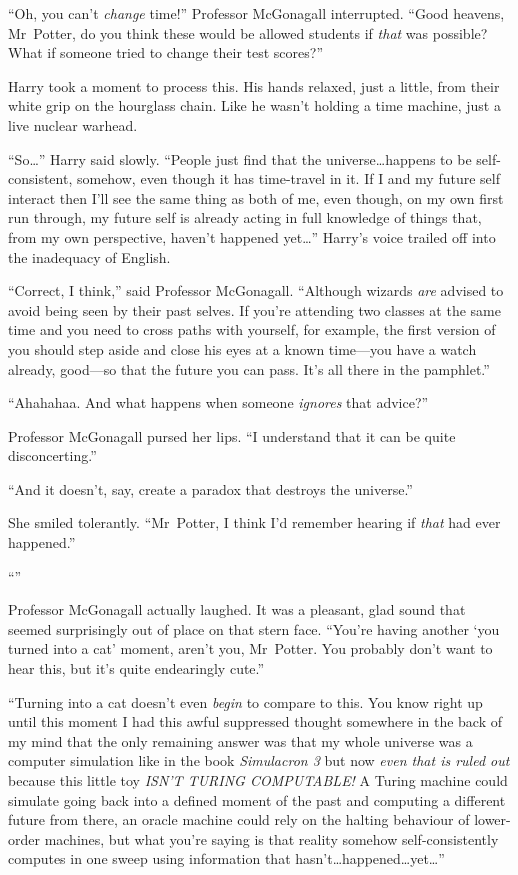 “Oh, you can’t \emph{change} time!” Professor McGonagall interrupted. “Good heavens, Mr~Potter, do you think these would be allowed students if \emph{that} was possible? What if someone tried to change their test scores?”

Harry took a moment to process this. His hands relaxed, just a little, from their white grip on the hourglass chain. Like he wasn’t holding a time machine, just a live nuclear warhead.

“So…” Harry said slowly. “People just find that the universe…happens to be self-consistent, somehow, even though it has time-travel in it. If I and my future self interact then I’ll see the same thing as both of me, even though, on my own first run through, my future self is already acting in full knowledge of things that, from my own perspective, haven’t happened yet…” Harry’s voice trailed off into the inadequacy of English.

“Correct, I think,” said Professor McGonagall. “Although wizards \emph{are} advised to avoid being seen by their past selves. If you’re attending two classes at the same time and you need to cross paths with yourself, for example, the first version of you should step aside and close his eyes at a known time—you have a watch already, good—so that the future you can pass. It’s all there in the pamphlet.”

“Ahahahaa. And what happens when someone \emph{ignores} that advice?”

Professor McGonagall pursed her lips. “I understand that it can be quite disconcerting.”

“And it doesn’t, say, create a paradox that destroys the universe.”

She smiled tolerantly. “Mr~Potter, I think I’d remember hearing if \emph{that} had ever happened.”

“”

Professor McGonagall actually laughed. It was a pleasant, glad sound that seemed surprisingly out of place on that stern face. “You’re having another ‘you turned into a cat’ moment, aren’t you, Mr~Potter. You probably don’t want to hear this, but it’s quite endearingly cute.”

“Turning into a cat doesn’t even \emph{begin} to compare to this. You know right up until this moment I had this awful suppressed thought somewhere in the back of my mind that the only remaining answer was that my whole universe was a computer simulation like in the book \emph{Simulacron 3} but now \emph{even that is ruled out} because this little toy \emph{ISN’T TURING COMPUTABLE!} A Turing machine could simulate going back into a defined moment of the past and computing a different future from there, an oracle machine could rely on the halting behaviour of lower-order machines, but what you’re saying is that reality somehow self-consistently computes in one sweep using information that hasn’t…happened…yet…”

